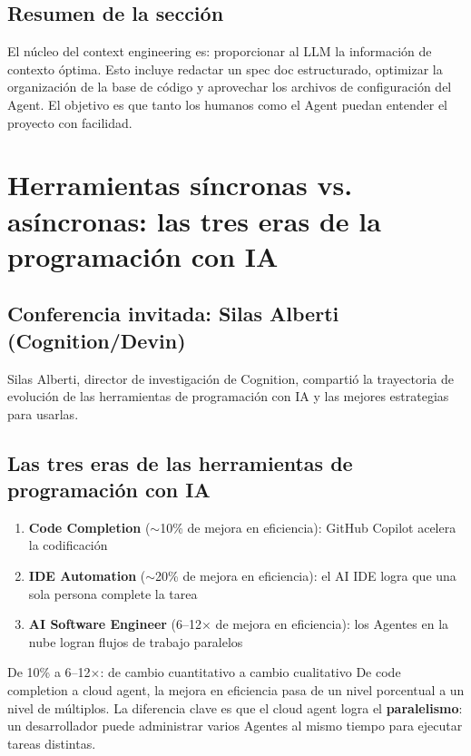 \documentclass[a4paper]{article}
\begin{document}
\subsection{Resumen de la sección}

El núcleo del context engineering es: proporcionar al LLM la información de contexto óptima. Esto incluye redactar un spec doc estructurado, optimizar la organización de la base de código y aprovechar los archivos de configuración del Agent. El objetivo es que tanto los humanos como el Agent puedan entender el proyecto con facilidad.
\section{Herramientas síncronas vs. asíncronas: las tres eras de la programación con IA}

\subsection{Conferencia invitada: Silas Alberti (Cognition/Devin)}

Silas Alberti, director de investigación de Cognition, compartió la trayectoria de evolución de las herramientas de programación con IA y las mejores estrategias para usarlas.

\subsection{Las tres eras de las herramientas de programación con IA}

\begin{enumerate}
    \item \textbf{Code Completion} ($\sim$10\% de mejora en eficiencia): GitHub Copilot acelera la codificación
    \item \textbf{IDE Automation} ($\sim$20\% de mejora en eficiencia): el AI IDE logra que una sola persona complete la tarea
    \item \textbf{AI Software Engineer} (6--12$\times$ de mejora en eficiencia): los Agentes en la nube logran flujos de trabajo paralelos
\end{enumerate}

\begin{importantbox}{De 10\% a 6--12$\times$: de cambio cuantitativo a cambio cualitativo}
De code completion a cloud agent, la mejora en eficiencia pasa de un nivel porcentual a un nivel de múltiplos. La diferencia clave es que el cloud agent logra el \textbf{paralelismo}: un desarrollador puede administrar varios Agentes al mismo tiempo para ejecutar tareas distintas.
\end{importantbox}
\end{document}
